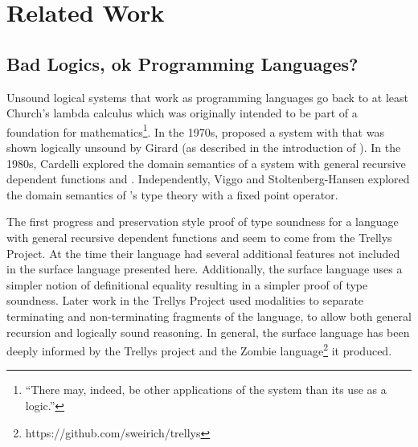 \section{Related Work}
 
\subsection{Bad Logics, ok Programming Languages?}
 
Unsound logical systems that work as programming languages go back to at least Church's lambda calculus which was originally intended to be part of a foundation for mathematics\footnote{
  ``There may, indeed, be other applications of the system than its use as a logic.''\cite[p.349]{10.2307/1968337}
}.
In the 1970s, \MartinL{} proposed a system with \tit{}\cite{Martin-Lof-1971} that was shown logically unsound by Girard (as described in the introduction of \cite{Martin-Lof-1972}).
In the 1980s, Cardelli explored the domain semantics of a system with general recursive dependent functions and \tit{}\cite{cardelli1986polymorphic}.
Independently, Viggo and Stoltenberg-Hansen\cite{PALMGREN1990135} explored the domain semantics of \MartinL{}'s type theory with a fixed point operator.

The first progress and preservation style proof of type soundness for a language with general recursive dependent functions and \tit{} seem to come from the Trellys Project\cite{sjoberg2012irrelevance}.
At the time their language had several additional features not included in the surface language presented here.
Additionally, the surface language uses a simpler notion of definitional equality resulting in a simpler proof of type soundness.
Later work in the Trellys Project\cite{casinghino2014combining,casinghino2014combiningthesis} used modalities to separate terminating and non-terminating fragments of the language, to allow both general recursion and logically sound reasoning. %
In general, the surface language has been deeply informed by the Trellys project\cite{sjoberg2012irrelevance,casinghino2014combining,casinghino2014combiningthesis,sjoberg2015programming,sjoberg2015dependently} and the Zombie language\footnote{https://github.com/sweirich/trellys} it produced.
 
 
